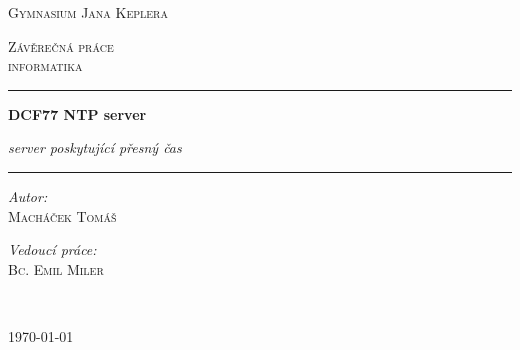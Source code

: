 \begin{titlepage}
    \begin{center}
        \vspace*{.06\textheight}

        \LARGE

        \textsc{Gymnasium Jana Keplera}

        \vspace{1.5cm}

        \Large

        \textsc{Závěrečná práce\\
        informatika}

        \vspace{1.5cm}

        \hrule

        \vspace{0.8cm}

        \LARGE
        \textbf{DCF77 NTP server}

        \vspace{0.2cm}
        \Large
        \emph{server poskytující přesný čas}

        \vspace{0.8cm}

        \hrule
        \vspace{2cm}

        \begin{minipage}[c]{0.4\textwidth}
            \begin{flushleft} \large
                \emph{Autor:}\\
                \textsc{Macháček Tomáš}
            \end{flushleft}
        \end{minipage}
        \begin{minipage}[c]{0.4\textwidth}
            \begin{flushright} \large
                \emph{Vedoucí práce:} \\
                \textsc{Bc. Emil Miler}
            \end{flushright}
        \end{minipage}\\[3cm]

        \vspace{4cm}

        \today

        \vfill

    \end{center}
\end{titlepage}
